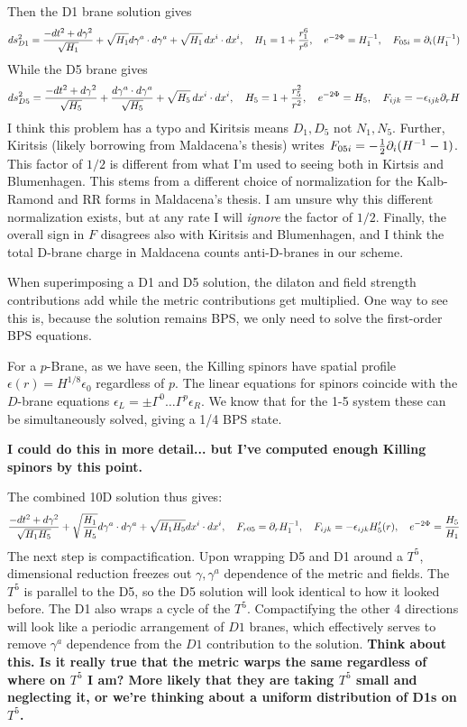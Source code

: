 \documentclass[11pt, class=article, crop=false]{standalone}
\begin{document}
\begin{enumerate}
	Then the D1 brane solution gives
	\[
		ds^2_{D1}= \frac{-dt^2 + d\gamma^2}{\sqrt{H_1}} + \sqrt{H_1} d \gamma^a \cdot d \gamma^a + \sqrt{H_1}\, dx^i \cdot dx^i, \quad H_1 = 1 + \frac{r_1^6}{r^6}, \quad e^{-2\Phi} = H_1^{-1}, \quad F_{05i} = \partial_i (H_1^{-1})
	\]
	While the D5 brane gives
	\[
		ds^2_{D5} = \frac{-dt^2 + d\gamma^2}{\sqrt{H_5}} + \frac{d \gamma^a \cdot d \gamma^a}{\sqrt{H_5}} + \sqrt{H_5} \, dx^i \cdot dx^i, \quad H_5 = 1 + \frac{r_5^2}{r^2}, \quad e^{-2\Phi} = H_5, \quad F_{ijk} = -\epsilon_{ijk} \partial_r H
	\]
	I think this problem has a typo and Kiritsis means $D_1, D_5$ not $N_1, N_5$. Further, Kiritsis (likely borrowing from Maldacena's thesis) writes $F_{05i} = -\frac12 \partial_i (H^{-1} - 1)$. This factor of $1/2$ is different from what I'm used to seeing both in Kirtsis and Blumenhagen. This stems from a different choice of normalization for the Kalb-Ramond and RR forms in Maldacena's thesis. I am unsure why this different normalization exists, but at any rate I will \emph{ignore} the factor of $1/2$. Finally, the overall sign in $F$ disagrees also with Kiritsis and Blumenhagen, and I think the total D-brane charge in Maldacena counts anti-D-branes in our scheme.
	
	When superimposing a D1 and D5 solution, the dilaton and field strength contributions add while the metric contributions get multiplied. One way to see this is, because the solution remains BPS, we only need to solve the first-order BPS equations.
	
	For a $p$-Brane, as we have seen, the Killing spinors have spatial profile $\epsilon(r) = H^{1/8} \epsilon_0$ regardless of $p$. The linear equations for spinors coincide with the $D$-brane equations $\epsilon_L = \pm \Gamma^0 \dots \Gamma^p \epsilon_R$. We know that for the 1-5 system these can be simultaneously solved, giving a 1/4 BPS state. 
	
	\textbf{I could do this in more detail... but I've computed enough Killing spinors by this point.}
	
	The combined 10D solution thus gives:
	\[
		\frac{-dt^2 + d\gamma^2}{\sqrt{H_1 H_5}} + \sqrt{\frac{H_1}{H_5}} d\gamma^a  \cdot d\gamma^a+ \sqrt{H_1 H_5} dx^i \cdot dx^i, \quad F_{r05} = \partial_r H_1^{-1}, \quad F_{ijk} = - \epsilon_{ijk} H_5'(r), \quad e^{-2\Phi} = \frac{H_5}{H_1}
	\]
	The next step is compactification. Upon wrapping D5 and D1 around a $T^5$, dimensional reduction freezes out $\gamma, \gamma^a$ dependence of the metric and fields.
	The $T^5$ is parallel to the D5, so the D5 solution will look identical to how it looked before. The D1 also wraps a cycle of the $T^5$. Compactifying the other 4 directions will look like a periodic arrangement of $D1$ branes, which effectively serves to remove $\gamma^a$ dependence from the $D1$ contribution to the solution. \textbf{Think about this. Is it really true that the metric warps the same regardless of where on $T^5$ I am? More likely that they are taking $T^5$ small and neglecting it, or we're thinking about a uniform distribution of D1s on $T^5$.}
	

\end{enumerate}
\end{document}
